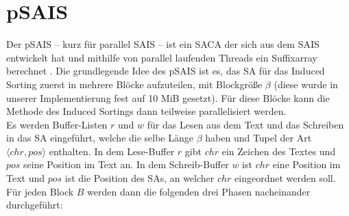 \section{pSAIS}
\label{section:psais}


Der pSAIS -- kurz für parallel SAIS -- ist ein SACA der sich aus dem SAIS entwickelt hat und mithilfe von parallel laufenden Threads ein Suffixarray berechnet \cite{psais}. Die grundlegende Idee des pSAIS ist es, das SA für das Induced Sorting zuerst in mehrere Blöcke aufzuteilen, mit Blockgröße $\beta$ (diese wurde in unserer Implementierung fest auf 10 MiB gesetzt). Für diese Blöcke kann die Methode des Induced Sortings dann teilweise parallelisiert werden.\\
Es werden Buffer-Listen $r$ und $w$ für das Lesen aus dem Text und das Schreiben in das SA  eingeführt, welche die selbe Länge $\beta$ haben und Tupel der Art $\langle chr, pos \rangle$ enthalten. In dem Lese-Buffer $r$ gibt $chr$ ein Zeichen des Textes und $pos$ seine Position im Text an. In dem Schreib-Buffer $w$ ist $chr$ eine Position im Text und $pos$ ist die Position des SAs, an welcher $chr$ eingeordnet werden soll. Für jeden Block $B$ werden dann die folgenden drei Phasen nacheinander durchgeführt:

